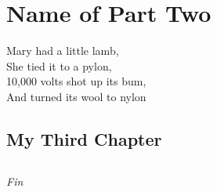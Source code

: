 \documentclass[
  11pt,       %
  twoside,    %
  openright   %
]{memoir}
\begin{document}
  \newpage
  \part{Name of Part Two}
  \begin{center}
    Mary had a little lamb,\\
    She tied it to a pylon,\\
    10,000 volts shot up its bum,\\
    And turned its wool to nylon
  \end{center}
  \vfil
  \newpage
  \addtocounter{page}{\value{oldpage}}

  \chapter{My Third Chapter}
  

  \newpage
  \chapter*{}
  \begin{vplace}[0.5]
    \begin{center}
      \textnormal{\textit{Fin}}
    \end{center}
  \end{vplace}
\end{document}
